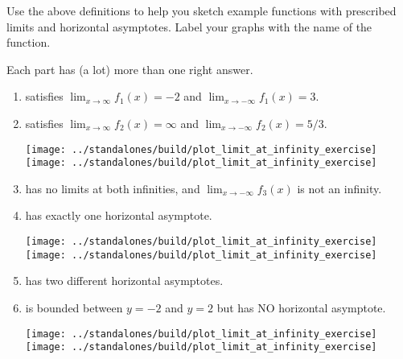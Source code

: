 \documentclass[../main.tex]{subfiles}
\begin{document}
  \begin{example}
    Use the above definitions to help you sketch example functions with prescribed limits and horizontal asymptotes. Label your graphs with the name of the function. 

    Each part has (a lot) more than one right answer. 

    \begin{enumerate}[label=\(f_{\arabic*}\)]
      \item satisfies \(\lim_{x \to \infty} f_{1}(x) = -2\) and \(\lim_{x \to -\infty} f_{1}(x) = 3\).
      \item satisfies \(\lim_{x \to \infty} f_{2}(x) = \infty\) and \(\lim_{x \to -\infty} f_{2}(x) = 5/3\).
        \begin{center}
          \texttt{[image: ../standalones/build/plot\_limit\_at\_infinity\_exercise]}
          \qquad
          \texttt{[image: ../standalones/build/plot\_limit\_at\_infinity\_exercise]}
        \end{center}

      \item has no limits at both infinities, and \(\lim_{x \to -\infty} f_{3}(x)\) is not an infinity. 
      \item has exactly one horizontal asymptote.

        \begin{center}
          \texttt{[image: ../standalones/build/plot\_limit\_at\_infinity\_exercise]}
          \qquad
          \texttt{[image: ../standalones/build/plot\_limit\_at\_infinity\_exercise]}
        \end{center}

      \item has two different horizontal asymptotes.
      \item is bounded between \(y = -2\) and \(y = 2\) but has NO horizontal asymptote.

        \begin{center}
          \texttt{[image: ../standalones/build/plot\_limit\_at\_infinity\_exercise]}
          \qquad
          \texttt{[image: ../standalones/build/plot\_limit\_at\_infinity\_exercise]}
        \end{center}
    \end{enumerate}

  \end{example}
  \clearpage
\end{document}
